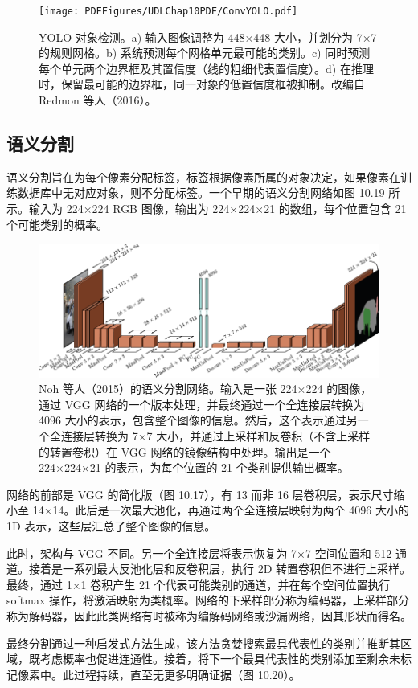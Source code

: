\documentclass[lang=cn,newtx,10pt,scheme=chinese]{elegantbook}
\begin{document}
\begin{figure}[ht!]
	\centering
	\texttt{[image: PDFFigures/UDLChap10PDF/ConvYOLO.pdf]}
	\caption{YOLO 对象检测。a) 输入图像调整为 448×448 大小，并划分为 7×7 的规则网格。b) 系统预测每个网格单元最可能的类别。c) 同时预测每个单元两个边界框及其置信度（线的粗细代表置信度）。d) 在推理时，保留最可能的边界框，同一对象的低置信度框被抑制。改编自 Redmon 等人（2016）。}
\end{figure}


\subsection{语义分割}
语义分割旨在为每个像素分配标签，标签根据像素所属的对象决定，如果像素在训练数据库中无对应对象，则不分配标签。一个早期的语义分割网络如图 10.19 所示。输入为 224×224 RGB 图像，输出为 224×224×21 的数组，每个位置包含 21 个可能类别的概率。

\begin{figure}[ht!]
	\centering
	\includegraphics[width=0.7\linewidth]{PDFFigures/UDLChap10PDF/ConvSemSeg.pdf}
	\caption{Noh 等人（2015）的语义分割网络。输入是一张 224×224 的图像，通过 VGG 网络的一个版本处理，并最终通过一个全连接层转换为 4096 大小的表示，包含整个图像的信息。然后，这个表示通过另一个全连接层转换为 7×7 大小，并通过上采样和反卷积（不含上采样的转置卷积）在 VGG 网络的镜像结构中处理。输出是一个 224×224×21 的表示，为每个位置的 21 个类别提供输出概率。}
\end{figure}

网络的前部是 VGG 的简化版（图 10.17），有 13 而非 16 层卷积层，表示尺寸缩小至 14×14。此后是一次最大池化，再通过两个全连接层映射为两个 4096 大小的 1D 表示，这些层汇总了整个图像的信息。

此时，架构与 VGG 不同。另一个全连接层将表示恢复为 7×7 空间位置和 512 通道。接着是一系列最大反池化层和反卷积层，执行 2D 转置卷积但不进行上采样。最终，通过 1×1 卷积产生 21 个代表可能类别的通道，并在每个空间位置执行 softmax 操作，将激活映射为类概率。网络的下采样部分称为编码器，上采样部分称为解码器，因此此类网络有时被称为编解码网络或沙漏网络，因其形状而得名。

最终分割通过一种启发式方法生成，该方法贪婪搜索最具代表性的类别并推断其区域，既考虑概率也促进连通性。接着，将下一个最具代表性的类别添加至剩余未标记像素中。此过程持续，直至无更多明确证据（图 10.20）。
\end{document}

